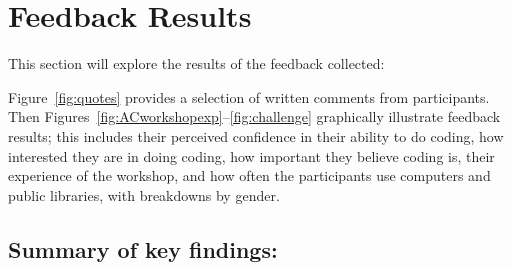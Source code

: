 \documentclass[12pt]{report} %
\begin{document}
\goodbreak
\section{Feedback Results} %
This section will explore the results of the feedback collected:

Figure~\ref{fig:quotes} provides a selection of written comments from participants. Then Figures~\ref{fig:ACworkshopexp}--\ref{fig:challenge} graphically illustrate feedback results; this includes their perceived confidence in their ability to do coding, how interested they are in doing coding, how important they believe coding is, their experience of the workshop, and how often the participants use computers and public libraries, with breakdowns by gender. 


\subsection{Summary of key findings:}
\end{document}
